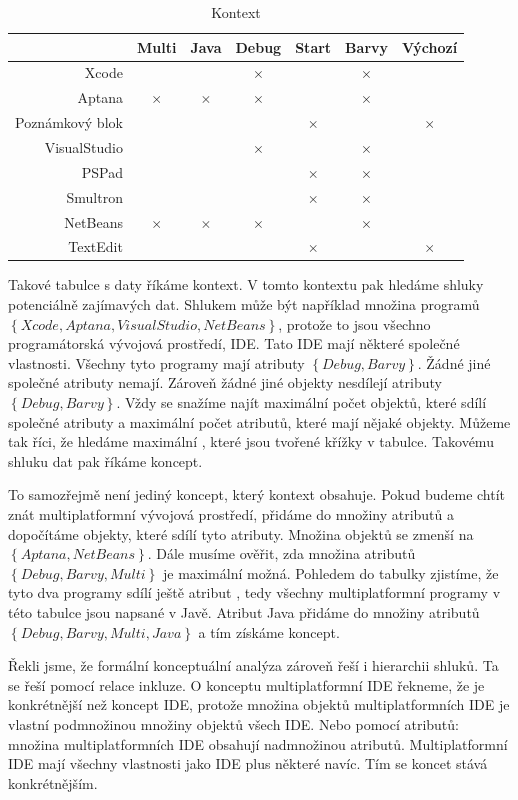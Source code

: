 \documentclass[12pt]{article}
\newcommand{\yes}{$\times$}
\newcommand{\adds}[1]{\left\{#1\right\}}
\begin{document}
\begin{table}
\begin{tabular}{r|cccccc}
\toprule
&Multi&Java&Debug&Start&Barvy&Výchozí\\
\midrule
Xcode&&&\yes&&\yes\\
Aptana&\yes&\yes&\yes&&\yes\\
Poznámkový blok&&&&\yes&&\yes\\
VisualStudio&&&\yes&&\yes\\
PSPad&&&&\yes&\yes\\
Smultron&&&&\yes&\yes\\
NetBeans&\yes&\yes&\yes&&\yes\\
TextEdit&&&&\yes&&\yes\\
\bottomrule
\end{tabular}
\caption{Kontext} \label{tab.con1}
\end{table}

Takové tabulce s daty říkáme kontext. V tomto kontextu pak hledáme shluky potenciálně zajímavých dat. Shlukem může být například množina programů $\adds{Xcode, Aptana, VisualStudio, NetBeans}$, protože to jsou všechno programátorská vývojová prostředí, IDE. Tato IDE mají některé společné vlastnosti. Všechny tyto programy mají atributy $\adds{Debug, Barvy}$. Žádné jiné společné atributy nemají. Zároveň žádné jiné objekty nesdílejí atributy $\adds{Debug, Barvy}$. Vždy se snažíme najít maximální počet objektů, které sdílí společné atributy a maximální počet atributů, které mají nějaké objekty. Můžeme tak říci, že hledáme maximální , které jsou tvořené křížky v tabulce. Takovému shluku dat pak říkáme koncept. 

To samozřejmě není jediný koncept, který kontext obsahuje. Pokud budeme chtít znát multiplatformní vývojová prostředí, přidáme do množiny atributů  a dopočítáme objekty, které sdílí tyto atributy. Množina objektů se zmenší na $\adds{Aptana, NetBeans}$. Dále musíme ověřit, zda množina atributů $\adds{Debug, Barvy, Multi}$ je maximální možná. Pohledem do tabulky zjistíme, že tyto dva programy sdílí ještě atribut , tedy všechny multiplatformní programy v této tabulce jsou napsané v Javě. Atribut Java přidáme do množiny atributů $\adds{Debug, Barvy, Multi, Java}$ a tím získáme koncept.

Řekli jsme, že formální konceptuální analýza zároveň řeší i hierarchii shluků. Ta se řeší pomocí relace inkluze. O konceptu multiplatformní IDE řekneme, že je konkrétnější než koncept IDE, protože množina objektů multiplatformních IDE je vlastní podmnožinou množiny objektů všech IDE. Nebo pomocí atributů: množina multiplatformních IDE obsahují nadmnožinou atributů. Multiplatformní IDE mají všechny vlastnosti jako IDE plus některé navíc. Tím se koncet stává konkrétnějším. 
\end{document}
